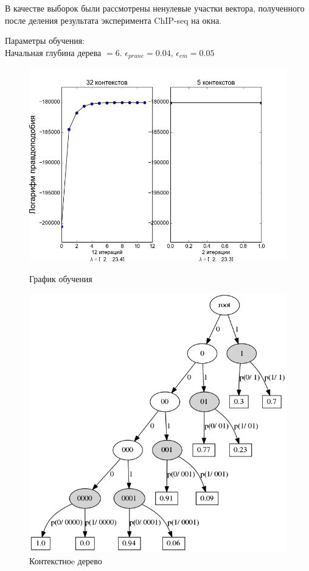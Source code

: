 \documentclass{matmex-diploma-custom}
\begin{document}
В качестве выборок были рассмотрены ненулевые участки вектора, полученного после деления результата эксперимента ChIP-seq на окна. 

Параметры обучения:\\
Начальная глубина дерева $= 6 $.
$\epsilon_{\textit{prune}} = 0.04$,
$\epsilon_{\textit{em}} = 0.05$
\begin{figure}[h!]\centering
\begin{minipage}[b]{0.49 \textwidth}
	\includegraphics[scale=0.47]{img/real/plot_.png}
	\centering
	\caption{ График обучения }
	\label{ris:log_likelihood}
\end{minipage}
\hfill
\begin{minipage}[b]{0.32 \textwidth}
	\includegraphics[scale=0.29]{img/real/predicted_trie.png}
	\centering
	\caption{ Контекстноe дерево }
	\label{ris:real_trie}
\end{minipage}
\end{figure}
\end{document}
